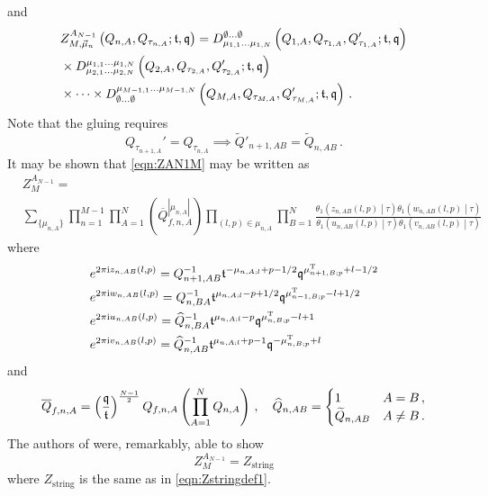 \documentclass[main.tex]{subfiles}
\begin{document}
and 
\begin{equation}
\begin{aligned}
&Z_{M,\vec{\mu}_n}^{A_{N-1}}\left(Q_{n,A},Q_{\tau_{n,A}};\mathfrak{t},\mathfrak{q}\right)=D^{\emptyset\dots\emptyset}_{\mu_{1,1}\dots\mu_{1,N}}\left(Q_{1,A},Q_{\tau_{1,A}},Q_{\tau_{1,A}}';\mathfrak{t},\mathfrak{q}\right)\\&\times D^{\mu_{1,1}\dots\mu_{1,N}}_{\mu_{2,1}\dots\mu_{2,N}}\left(Q_{2,A},Q_{\tau_{2,A}},Q_{\tau_{2,A}}';\mathfrak{t},\mathfrak{q}\right)\label{eqn:ZAN1M}\\
&\times\dots\times D_{\emptyset\dots\emptyset}^{\mu_{M-1,1}\dots\mu_{M-1,N}}\left(Q_{M,A},Q_{\tau_{M,A}},Q_{\tau_{M,A}}';\mathfrak{t},\mathfrak{q}\right)\,.
\end{aligned}
\end{equation}
Note that the gluing requires
\begin{equation}
Q_{\tau_{n+1,A}}'=Q_{\tau_{n,A}}\implies\widetilde{Q}'_{n+1,AB}=\widetilde{Q}_{n,AB}\,.
\end{equation}
It may be shown that \cite{Haghighat:2013tka} \eqref{eqn:ZAN1M} may be written as
\begin{equation}
\begin{aligned}
&Z_M^{A_{N-1}}=\\
&\sum_{\{\mu_{n,A}\}}\prod_{n=1}^{M-1}\prod_{A=1}^N\left(\overline{Q}_{f,n,A}^{|\mu_{n,A}|}\right)\prod_{(l,p)\in\mu_{n,A}}\prod_{B=1}^N\frac{\theta_1\left(z_{n,AB}(l,p)\middle|\tau\right)\theta_1\left(w_{n,AB}(l,p)\middle|\tau\right)}{\theta_1\left(u_{n,AB}(l,p)\middle|\tau\right)\theta_1\left(v_{n,AB}(l,p)\middle|\tau\right)}
\end{aligned}
\end{equation}
where
\begin{align}
&e^{2\pi\mathrm{i} z_{n,AB}(l,p)}=Q_{n+1,AB}^{-1}\mathfrak{t}^{-\mu_{n,A;l}+p-1/2}\mathfrak{q}^{\mu_{n+1,B;p}^{\operatorname{T}}+l-1/2}\\
&e^{2\pi\mathrm{i} w_{n,AB}(l,p)}=Q_{n,BA}^{-1}\mathfrak{t}^{\mu_{n,A;l}-p+1/2}\mathfrak{q}^{\mu_{n-1,B;p}^{\operatorname{T}}-l+1/2}\\
&e^{2\pi\mathrm{i} u_{n,AB}(l,p)}=\widehat{Q}_{n,BA}^{-1}\mathfrak{t}^{\mu_{n,A;l}-p}\mathfrak{q}^{\mu_{n,B;p}^{\operatorname{T}}-l+1}\\
&e^{2\pi\mathrm{i} v_{n,AB}(l,p)}=\widehat{Q}_{n,AB}^{-1}\mathfrak{t}^{\mu_{n,A;l}+p-1}\mathfrak{q}^{-\mu_{n,B;p}^{\operatorname{T}}+l}
\end{align}
and
\begin{equation}
\overline{Q}_{f,n,A}=\left(\frac{\mathfrak{q}}{\mathfrak{t}}\right)^{\frac{N-1}{2}}Q_{f,n,A}\left(\prod_{A=1}^N Q_{n,A}\right)\,,\quad \widehat{Q}_{n,AB}=\begin{cases}1&\text{$A=B$}\,,\\
\widetilde{Q}_{n,AB}&\text{$A\neq B$}\,.\end{cases}
\end{equation}
The authors of \cite{Haghighat:2013tka} were, remarkably, able to show
\begin{equation}
Z_M^{A_{N-1}}=Z_{\text{string}}
\end{equation}
where $Z_{\text{string}}$ is the same as in \eqref{eqn:Zstringdef1}.
\end{document}
